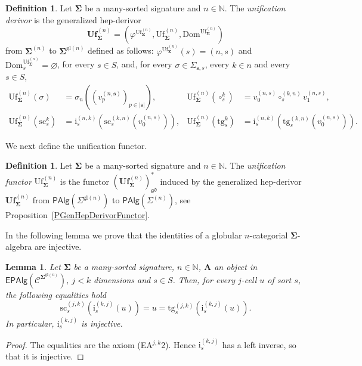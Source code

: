 \documentclass[a4paper, reqno
]{amsart}
\newcommand{\bb}[1]{\ensuremath{\lvert #1 \rvert}}
\newcommand{\sig}[1]{\mathbf{#1}}             %
\newcommand{\spec}[1]{\boldsymbol{\mathcal{#1}}} %
\newcommand{\Dom}{\mathrm{Dom}}
\newcommand{\gd}{\mathfrak{gd}}              %
\newcommand{\gl}{\mathrm{gl}}                %
\newcommand{\src}{\mathrm{sc}}
\newcommand{\tgt}{\mathrm{tg}}
\newcommand{\Uf}{\mathrm{Uf}}
\newcommand{\bUf}{\mathbf{Uf}}
\theoremstyle{plain}
\newtheorem{lemma}[theorem]{Lemma}
\theoremstyle{definition}
\newtheorem{definition}[theorem]{Definition}
\begin{document}
\begin{definition}\label{DUnifDerivor}
Let $\sig{\Sigma}$ be a many-sorted signature and $n\in\mathbb{N}$.
The \emph{unification derivor} is the generalized hep-derivor
$$
\bUf^{(n)}_{\sig{\Sigma}}=\left(\varphi^{\Uf^{(n)}_{\sig{\Sigma}}},\Uf^{(n)}_{\sig{\Sigma}},\Dom^{\Uf^{(n)}_{\sig{\Sigma}}}\right)
$$
from $\sig{\Sigma}^{(n)}$ to $\sig{\Sigma}^{\gl(n)}$ defined as follows: $\varphi^{\Uf^{(n)}_{\sig{\Sigma}}}(s)=(n,s)$ and $\Dom^{\Uf^{(n)}_{\sig{\Sigma}}}_{s}=\varnothing$, for every $s\in S$, and, for every $\sigma\in\Sigma_{\mathbf{s},s}$, every $k\in n$ and every $s\in S$,
\begin{align*}
\Uf^{(n)}_{\sig{\Sigma}}(\sigma)&=\sigma_{n}((v^{(n,\mathbf{s})}_{p})_{p\in\bb{\mathbf{s}}}), &
\Uf^{(n)}_{\sig{\Sigma}}(\circ^{k}_{s})&=v^{(n,s)}_{0}\circ^{(k,n)}_{s}v^{(n,s)}_{1},\\
\Uf^{(n)}_{\sig{\Sigma}}(\src^{k}_{s})&=\mathrm{i}^{(n,k)}_{s}(\src^{(k,n)}_{s}(v^{(n,s)}_{0})), &
\Uf^{(n)}_{\sig{\Sigma}}(\tgt^{k}_{s})&=\mathrm{i}^{(n,k)}_{s}(\tgt^{(k,n)}_{s}(v^{(n,s)}_{0})).
\end{align*}
\end{definition}

We next define the unification functor.

\begin{definition}\label{DUnification}
Let $\sig{\Sigma}$ be a many-sorted signature and $n\in\mathbb{N}$.
The \emph{unification functor} $\Uf^{(n)}_{\sig{\Sigma}}$ is the functor $(\bUf^{(n)}_{\sig{\Sigma}})^{\ast}_{\gd}$ induced by the generalized hep-derivor $\bUf^{(n)}_{\sig{\Sigma}}$ from $\mathsf{PAlg}(\Sigma^{\gl(n)})$ to $\mathsf{PAlg}(\Sigma^{(n)})$, see Proposition~\ref{PGenHepDerivorFunctor}.
\end{definition}

In the following lemma we prove that the identities of a globular $n$-categorial $\sig{\Sigma}$-algebra are injective.

\begin{lemma}\label{LUnifInj}
Let $\sig{\Sigma}$ be a many-sorted signature, $n\in\mathbb{N}$, $\mathbf{A}$ an object in $\mathsf{EPAlg}(\spec{C}^{\sig{\Sigma}^{\gl(n)}})$, $j<k$ dimensions and $s\in S$.
Then, for every $j$-cell $u$ of sort $s$, the following equalities hold
$$
\src^{(j,k)}_{s}\left(\mathrm{i}^{(k,j)}_{s}(u)\right)=u=\tgt^{(j,k)}_{s}\left(\mathrm{i}^{(k,j)}_{s}(u)\right).
$$
In particular, $\mathrm{i}^{(k,j)}_{s}$ is injective.
\end{lemma}
\begin{proof}
The equalities are the axiom (EA$^{j,k}$2).
Hence $\mathrm{i}^{(k,j)}_{s}$ has a left inverse, so that it is injective.
\end{proof}
\end{document}
